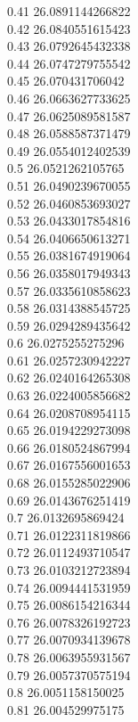{0.41	26.0891144266822\\
0.42	26.0840551615423\\
0.43	26.0792645432338\\
0.44	26.0747279755542\\
0.45	26.070431706042\\
0.46	26.0663627733625\\
0.47	26.0625089581587\\
0.48	26.0588587371479\\
0.49	26.0554012402539\\
0.5	26.0521262105765\\
0.51	26.0490239670055\\
0.52	26.0460853693027\\
0.53	26.0433017854816\\
0.54	26.0406650613271\\
0.55	26.0381674919064\\
0.56	26.0358017949343\\
0.57	26.0335610858623\\
0.58	26.0314388545725\\
0.59	26.0294289435642\\
0.6	26.0275255275296\\
0.61	26.0257230942227\\
0.62	26.0240164265308\\
0.63	26.0224005856682\\
0.64	26.0208708954115\\
0.65	26.0194229273098\\
0.66	26.0180524867994\\
0.67	26.0167556001653\\
0.68	26.0155285022906\\
0.69	26.0143676251419\\
0.7	26.0132695869424\\
0.71	26.0122311819866\\
0.72	26.0112493710547\\
0.73	26.0103212723894\\
0.74	26.0094441531959\\
0.75	26.0086154216344\\
0.76	26.0078326192723\\
0.77	26.0070934139678\\
0.78	26.0063955931567\\
0.79	26.0057370575194\\
0.8	26.0051158150025\\
0.81	26.004529975175\\
}
